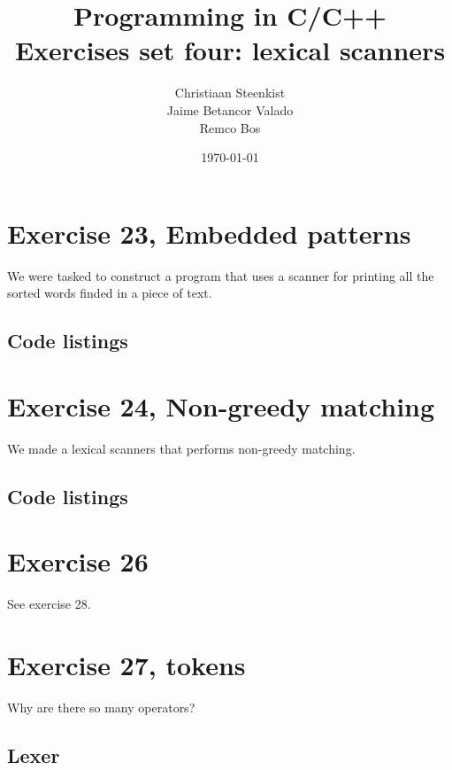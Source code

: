 \documentclass[11pt]{article}
\begin{document}
\title{Programming in C/C++ \\
       Exercises set four: lexical scanners
}
\date{\today}
\author{Christiaan Steenkist \\
Jaime Betancor Valado \\
Remco Bos \\
}

\maketitle
\section*{Exercise 23, Embedded patterns}
We were tasked to construct a program that uses a scanner for printing all the sorted words finded in a piece of text.
\subsection*{Code listings}




\section*{Exercise 24, Non-greedy matching}
We made a lexical scanners that performs non-greedy matching.

\subsection*{Code listings}





\section*{Exercise 26}
See exercise 28.

\section*{Exercise 27, tokens}
Why are there so many operators?

\subsection*{Lexer}

\end{document}
